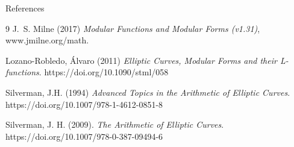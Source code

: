 \begin{hyperbolicbox}{References}
    \begingroup{}
    \vspace{-1em}
    \begin{thebibliography}{9}
    \normalsize
    J.~S. Milne (2017) \textit{Modular Functions and Modular Forms (v1.31)}, www.jmilne.org/math.
    
    Lozano-Robledo, Álvaro (2011) \textit{Elliptic Curves, Modular Forms and their L-functions}. https://doi.org/10.1090/stml/058 
    
    Silverman, J.H. (1994) \textit{Advanced Topics in the Arithmetic of Elliptic Curves}. https://doi.org/10.1007/978-1-4612-0851-8

    Silverman, J. H. (2009). \textit{The Arithmetic of Elliptic Curves}. https://doi.org/10.1007/978-0-387-09494-6
    
    \end{thebibliography}
    \endgroup
\end{hyperbolicbox}